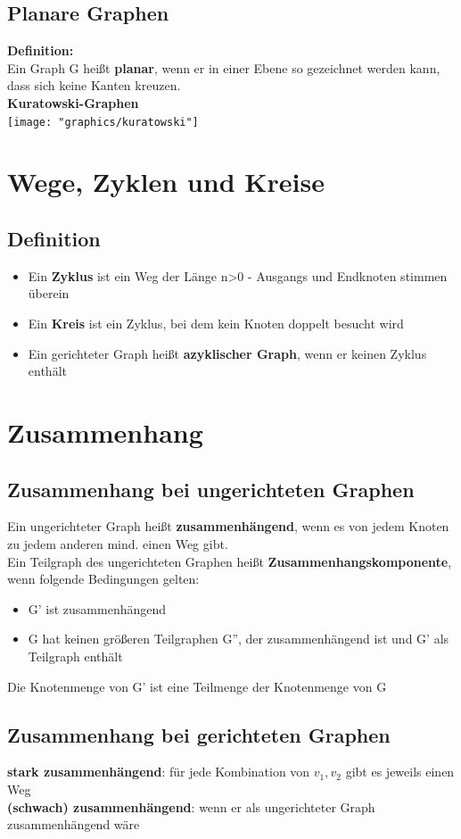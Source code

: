 \documentclass{scrreprt}
\begin{document}
\subsection{Planare Graphen}
\textbf{Definition:}
\\Ein Graph G heißt \textbf{planar}, wenn er in einer Ebene so gezeichnet werden kann, dass sich keine Kanten kreuzen.
\\\textbf{Kuratowski-Graphen}
\\\texttt{[image: "graphics/kuratowski"]}
\pagebreak
\section{Wege, Zyklen und Kreise}
\subsection{Definition}
\begin{itemize}
    \item Ein \textbf{Zyklus} ist ein Weg der Länge n>0 - Ausgangs und Endknoten stimmen überein
    \item Ein \textbf{Kreis} ist ein Zyklus, bei dem kein Knoten doppelt besucht wird
    \item Ein gerichteter Graph heißt \textbf{azyklischer Graph}, wenn er keinen Zyklus enthält
\end{itemize}
\section{Zusammenhang}
\subsection{Zusammenhang bei ungerichteten Graphen}
Ein ungerichteter Graph heißt \textbf{zusammenhängend}, wenn es von jedem Knoten zu jedem anderen mind. einen Weg gibt.
\\Ein Teilgraph des ungerichteten Graphen heißt \textbf{Zusammenhangskomponente}, wenn folgende Bedingungen gelten:
\begin{itemize}
    \item G' ist zusammenhängend
    \item G hat keinen größeren Teilgraphen G'', der zusammenhängend ist und G' als Teilgraph enthält 
\end{itemize}
Die Knotenmenge von G' ist eine Teilmenge der Knotenmenge von G
\subsection{Zusammenhang bei gerichteten Graphen}
\textbf{stark zusammenhängend}: für jede Kombination von $v_{1},v_{2}$ gibt es jeweils einen Weg
\\\textbf{(schwach) zusammenhängend}: wenn er als ungerichteter Graph zusammenhängend wäre
\end{document}
